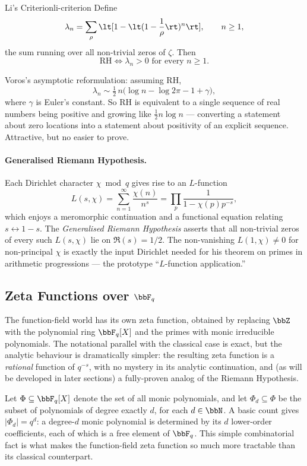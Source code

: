 \begin{Theorem}{Li's Criterion}{li-criterion}
  Define
  $$\lambda_n=\sum_{\rho}\lt[1-\lt(1-\frac{1}{\rho}\rt)^{n}\rt], \qquad n\geq 1,$$
  the sum running over all non-trivial zeros of $\zeta$. Then
  $$\mathrm{RH}\iff \lambda_n>0 \text{ for every } n\geq 1.$$
\end{Theorem}

Voros's asymptotic reformulation: assuming RH,
$$\lambda_n\sim \tfrac{1}{2}\,n\bigl(\log n-\log 2\pi-1+\gamma\bigr),$$
where $\gamma$ is Euler's constant. So RH is equivalent to a single sequence of real numbers being positive and growing like $\tfrac{1}{2}n\log n$ --- converting a statement about zero locations into a statement about positivity of an explicit sequence. Attractive, but no easier to prove.

\paragraph{Generalised Riemann Hypothesis.} Each Dirichlet character $\chi\bmod q$ gives rise to an $L$-function
$$L(s,\chi)=\sum_{n=1}^{\infty}\frac{\chi(n)}{n^s}=\prod_p\frac{1}{1-\chi(p)p^{-s}},$$
which enjoys a meromorphic continuation and a functional equation relating $s\leftrightarrow 1-s$. The \emph{Generalised Riemann Hypothesis} asserts that all non-trivial zeros of every such $L(s,\chi)$ lie on $\Re(s)=1/2$. The non-vanishing $L(1,\chi)\neq 0$ for non-principal $\chi$ is exactly the input Dirichlet needed for his theorem on primes in arithmetic progressions --- the prototype ``$L$-function application.''

\subsection{Zeta Functions over \texorpdfstring{$\bbF_q$}{Fq}}
The function-field world has its own zeta function, obtained by replacing $\bbZ$ with the polynomial ring $\bbF_q[X]$ and the primes with monic irreducible polynomials. The notational parallel with the classical case is exact, but the analytic behaviour is dramatically simpler: the resulting zeta function is a \emph{rational} function of $q^{-s}$, with no mystery in its analytic continuation, and (as will be developed in later sections) a fully-proven analog of the Riemann Hypothesis.

Let $\Phi\subseteq\bbF_q[X]$ denote the set of all monic polynomials, and let $\Phi_d\subseteq\Phi$ be the subset of polynomials of degree exactly $d$, for each $d\in\bbN$. A basic count gives $|\Phi_d|=q^d$: a degree-$d$ monic polynomial is determined by its $d$ lower-order coefficients, each of which is a free element of $\bbF_q$. This simple combinatorial fact is what makes the function-field zeta function so much more tractable than its classical counterpart.

